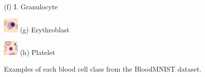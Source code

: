 \begin{figure}
\begin{minipage}{0.22\textwidth}
        (f) I. Granulocyte
    \end{minipage}
    \hfill
    \begin{minipage}{0.22\textwidth}
        \includegraphics[width=\linewidth]{images/bloodmnist_classes/erythroblast.png}
        (g) Erythroblast
    \end{minipage}
    \hfill
    \begin{minipage}{0.22\textwidth}
        \includegraphics[width=\linewidth]{images/bloodmnist_classes/platelet.png}
        (h) Platelet
    \end{minipage}
    \caption{Examples of each blood cell class from the BloodMNIST dataset.}\label{fig:bloodmnist_examples}
\end{figure}
